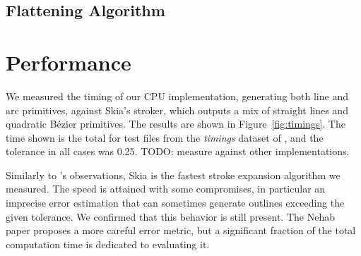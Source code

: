 \documentclass[sigconf, authordraft]{acmart}
\begin{document}
\subsection{Flattening Algorithm}



\section{Performance}


We measured the timing of our CPU implementation, generating both line and arc primitives, against Skia's stroker, which outputs a mix of straight lines and quadratic Bézier primitives. The results are shown in Figure~\ref{fig:timings}. The time shown is the total for test files from the \emph{timings} dataset of \cite{Nehab2020}, and the tolerance in all cases was 0.25. TODO: measure against other implementations.

Similarly to \cite{Nehab2020}'s observations, Skia is the fastest stroke expansion algorithm we measured. The speed is attained with some compromises, in particular an imprecise error estimation that can sometimes generate outlines exceeding the given tolerance. We confirmed that this behavior is still present. The Nehab paper proposes a more careful error metric, but a significant fraction of the total computation time is dedicated to evaluating it.
\end{document}
